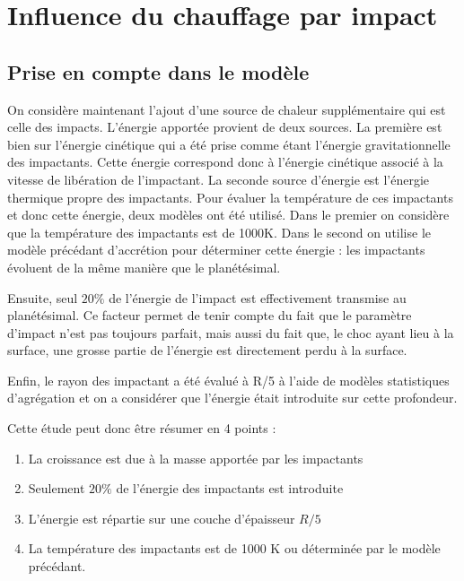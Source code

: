 \documentclass[10pt,a4paper]{article}
\numberwithin{equation}{section}
\begin{document}
\section{Influence du chauffage par impact}

\subsection{Prise en compte dans le modèle}
On considère maintenant l'ajout d'une source de chaleur supplémentaire qui est celle des impacts. L'énergie apportée provient de deux sources. La première est bien sur l'énergie cinétique qui a été prise comme étant l'énergie gravitationnelle des impactants. Cette énergie correspond donc à l'énergie cinétique associé à la vitesse de libération de l'impactant. La seconde source d'énergie est l'énergie thermique propre des impactants. Pour évaluer la température de ces impactants et donc cette énergie, deux modèles ont été utilisé. Dans le premier on considère que la température des impactants est de 1000K. Dans le second on utilise le modèle précédant d'accrétion pour déterminer cette énergie : les impactants évoluent de la même manière que le planétésimal.
\medskip

Ensuite, seul $20\%$ de l'énergie de l'impact est effectivement transmise au planétésimal. Ce facteur permet de tenir compte du fait que le paramètre d'impact n'est pas toujours parfait, mais aussi du fait que, le choc ayant lieu à la surface, une grosse partie de l'énergie est directement perdu à la surface.
\medskip

Enfin, le rayon des impactant a été évalué à R/5 à l'aide de modèles statistiques d'agrégation et on a considérer que l'énergie était introduite sur cette profondeur.

Cette étude peut donc être résumer en 4 points :
\begin{enumerate}
\item La croissance est due à la masse apportée par les impactants
\item Seulement $20\%$ de l'énergie des impactants est introduite
\item L'énergie est répartie sur une couche d'épaisseur $R/5$
\item La température des impactants est de 1000 K ou déterminée par le modèle précédant.
\end{enumerate}
\end{document}
